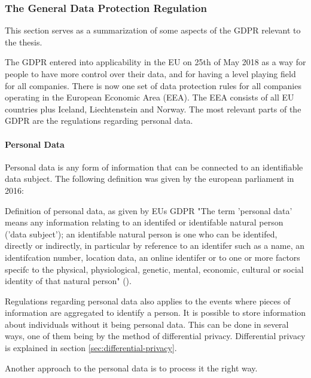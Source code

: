 \subsubsection{The General Data Protection Regulation}
\label{sec:GDPR}
This section serves as a summarization of some aspects of the GDPR relevant to the thesis.

The GDPR entered into applicability in the EU on 25th of May 2018 as a way for people to have more control over their data, and for having a level playing field for all companies. There is now one set of data protection rules for all companies operating in the European Economic Area (EEA). The EEA consists of all EU countries plus Iceland, Liechtenstein and Norway. The most relevant parts of the GDPR are the regulations regarding personal data.

\paragraph{Personal Data}
\label{sec:personal_data}
Personal data is any form of information that can be connected to an identifiable data subject. The following definition was given by the european parliament in 2016:

\begin{myquote}{Definition of personal data, as given by EUs GDPR}
    "The term 'personal data' means any information relating to an identifed or identifable natural person ('data subject'); an identifable natural person is one who can be identifed, directly or indirectly, in particular by reference to an identifer such as a name, an identifcation number, location data, an online identifer or to one or more factors specifc to the physical, physiological, genetic, mental, economic, cultural or social identity of that natural person" (\cite{in2023gdpr_website}).
\end{myquote}

Regulations regarding personal data also applies to the events where pieces of information are aggregated to identify a person. It is possible to store information about individuals without it being personal data. This can be done in several ways, one of them being by the method of differential privacy. Differential privacy is explained in section \ref{sec:differential-privacy}.

Another approach to the personal data is to process it the right way.

